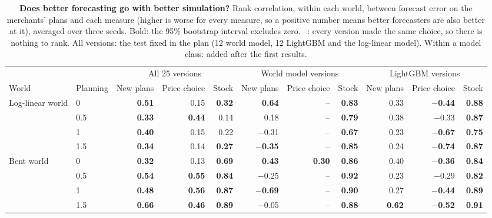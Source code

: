 \begin{table}[t]
\centering
\caption{\textbf{Does better forecasting go with better simulation?} Rank correlation, within each world, between
forecast error on the merchants' plans and each measure (higher is worse for every measure, so a positive number
means better forecasters are also better at it), averaged over three seeds. Bold: the 95\% bootstrap interval excludes
zero. --: every version made the same choice, so there is nothing to rank. All versions: the test fixed in the plan (12 world model, 12 LightGBM and the log-linear model). Within a model
class: added after the first results.}
\label{tab:link}
\footnotesize\setlength{\tabcolsep}{4pt}
\begin{adjustbox}{max width=\textwidth}
\begin{tabular}{llrrrrrrrrr}
\toprule
 & & \multicolumn{3}{c}{All 25 versions} & \multicolumn{3}{c}{World model versions} & \multicolumn{3}{c}{LightGBM versions} \\
\cmidrule(lr){3-5}\cmidrule(lr){6-8}\cmidrule(lr){9-11}
World & Planning & New plans & Price choice & Stock & New plans & Price choice & Stock & New plans & Price choice & Stock \\
\midrule
Log-linear world & 0 & \textbf{0.51} & 0.15 & \textbf{0.32} & \textbf{0.64} & -- & \textbf{0.83} & 0.33 & \textbf{$-$0.44} & \textbf{0.88} \\
 & 0.5 & \textbf{0.33} & \textbf{0.44} & 0.14 & 0.18 & -- & \textbf{0.79} & 0.38 & $-$0.33 & \textbf{0.87} \\
 & 1 & \textbf{0.40} & 0.15 & 0.22 & $-$0.31 & -- & \textbf{0.67} & 0.23 & \textbf{$-$0.67} & \textbf{0.75} \\
 & 1.5 & \textbf{0.34} & 0.14 & \textbf{0.27} & \textbf{$-$0.35} & -- & \textbf{0.85} & 0.24 & \textbf{$-$0.74} & \textbf{0.87} \\
Bent world & 0 & \textbf{0.32} & 0.13 & \textbf{0.69} & \textbf{0.43} & \textbf{0.30} & \textbf{0.86} & 0.40 & \textbf{$-$0.36} & \textbf{0.84} \\
 & 0.5 & \textbf{0.54} & \textbf{0.55} & \textbf{0.84} & $-$0.25 & -- & \textbf{0.92} & 0.23 & $-$0.29 & \textbf{0.82} \\
 & 1 & \textbf{0.48} & \textbf{0.56} & \textbf{0.87} & \textbf{$-$0.69} & -- & \textbf{0.90} & 0.27 & \textbf{$-$0.44} & \textbf{0.89} \\
 & 1.5 & \textbf{0.66} & \textbf{0.46} & \textbf{0.89} & $-$0.05 & -- & \textbf{0.88} & \textbf{0.62} & \textbf{$-$0.52} & \textbf{0.91} \\
\bottomrule
\end{tabular}
\end{adjustbox}
\end{table}
